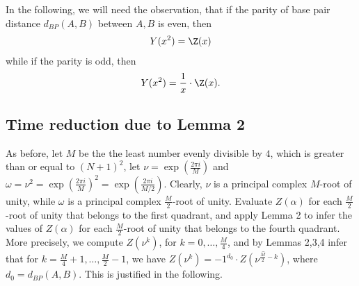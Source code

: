In the following, we will need the observation, that if the parity of
base pair distance $d_{BP}(A,B)$ between $A,B$ is
even, then
\begin{eqnarray}
\label{eqn:evenY}
Y(x^2) = \Z(x)
\end{eqnarray}
while if the parity is odd,
then
\begin{eqnarray}
\label{eqn:oddY}
Y(x^2) = \frac{1}{x} \cdot \Z(x).
\end{eqnarray}

\subsection{Time reduction due to Lemma 2}
As before, let $M$ be the the least number evenly divisible by $4$, which is
greater than or equal to $(N+1)^2$, let $\nu = \exp(\frac{2 \pi i}{M})$
and $\omega=\nu^2 = \exp(\frac{2 \pi i}{M})^2 =
\exp(\frac{2 \pi i}{M/2})$. Clearly, $\nu$ is a principal complex
$M$-root of unity, while $\omega$ is a principal complex $\frac{M}{2}$-root
of unity. Evaluate $Z(\alpha)$ for each $\frac{M}{2}$-root of unity
that belongs to the first quadrant, and apply Lemma 2 to infer the values
of $Z(\alpha)$ for each $\frac{M}{2}$-root of unity that belongs to the
fourth quadrant. More precisely,
we compute $Z(\nu^k)$, for $k=0,\ldots,\frac{M}{4}$, and by Lemmas 2,3,4 infer
that for $k=\frac{M}{4}+1,\ldots,\frac{M}{2}-1$, we have
$Z(\nu^{k})= -1^{d_0} \cdot \overline{Z(\nu^{\frac{M}{2}-k})}$, where
$d_0 = d_{BP}(A,B)$. This is justified in the following.

